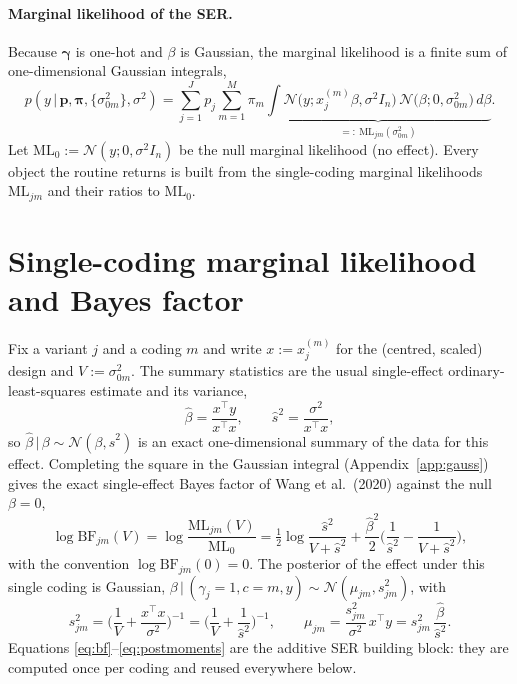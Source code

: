 \documentclass[11pt]{article}
\newcommand{\Nor}{\mathcal{N}}
\newcommand{\given}{\,\vert\,}
\newcommand{\sigsq}{\sigma^{2}}
\newcommand{\sigz}[1]{\sigma_{0#1}^{2}}
\newcommand{\BF}{\mathrm{BF}}
\newcommand{\ML}{\mathrm{ML}}
\newcommand{\half}{\tfrac{1}{2}}
\newcommand{\xjm}{x_j^{(m)}}
\theoremstyle{plain}
\theoremstyle{remark}
\begin{document}
\paragraph{Marginal likelihood of the SER.} Because $\bm\gamma$ is one-hot and
$\beta$ is Gaussian, the marginal likelihood is a finite sum of one-dimensional
Gaussian integrals,
\begin{equation}\label{eq:ml-ser}
  p(y\given\bm p,\bm\pi,\{\sigz{m}\},\sigsq)
  =\sum_{j=1}^{J} p_j \sum_{m=1}^{M}\pi_m
   \underbrace{\int \Nor\!\big(y;\xjm\beta,\sigsq I_n\big)\,
                    \Nor\!\big(\beta;0,\sigz{m}\big)\,d\beta}_{\displaystyle =:\ \ML_{jm}(\sigz{m})}.
\end{equation}
Let $\ML_0:=\Nor(y;0,\sigsq I_n)$ be the null marginal likelihood (no effect).
Every object the routine returns is built from the single-coding marginal
likelihoods $\ML_{jm}$ and their ratios to $\ML_0$.

\section{Single-coding marginal likelihood and Bayes factor}\label{sec:onecoding}

Fix a variant $j$ and a coding $m$ and write $x:=\xjm$ for the (centred, scaled)
design and $V:=\sigz{m}$. The summary statistics are the usual single-effect
ordinary-least-squares estimate and its variance,
\begin{equation}\label{eq:ols}
  \hat\beta=\frac{x^{\!\top}y}{x^{\!\top}x},
  \qquad
  \hat s^{2}=\frac{\sigsq}{x^{\!\top}x},
\end{equation}
so $\hat\beta\given\beta\sim\Nor(\beta,\hat s^{2})$ is an exact one-dimensional
summary of the data for this effect. Completing the square in the Gaussian
integral (Appendix~\ref{app:gauss}) gives the exact single-effect Bayes factor of
Wang et al.\ (2020) against the null $\beta=0$,
\begin{equation}\label{eq:bf}
\boxed{\;
  \log\BF_{jm}(V)
  =\log\frac{\ML_{jm}(V)}{\ML_0}
  =\half\log\frac{\hat s^{2}}{V+\hat s^{2}}
   +\frac{\hat\beta^{2}}{2}\Big(\frac{1}{\hat s^{2}}-\frac{1}{V+\hat s^{2}}\Big),
\;}
\end{equation}
with the convention $\log\BF_{jm}(0)=0$. The posterior of the effect under this
single coding is Gaussian, $\beta\given(\gamma_j=1,c=m,y)\sim\Nor(\mu_{jm},s_{jm}^{2})$,
with
\begin{equation}\label{eq:postmoments}
  s_{jm}^{2}=\Big(\frac{1}{V}+\frac{x^{\!\top}x}{\sigsq}\Big)^{-1}
           =\Big(\frac1V+\frac1{\hat s^2}\Big)^{-1},
  \qquad
  \mu_{jm}=\frac{s_{jm}^{2}}{\sigsq}\,x^{\!\top}y
          =s_{jm}^{2}\,\frac{\hat\beta}{\hat s^{2}}.
\end{equation}
Equations \eqref{eq:bf}--\eqref{eq:postmoments} are the additive SER building
block: they are computed once per coding and reused everywhere below.
\end{document}
